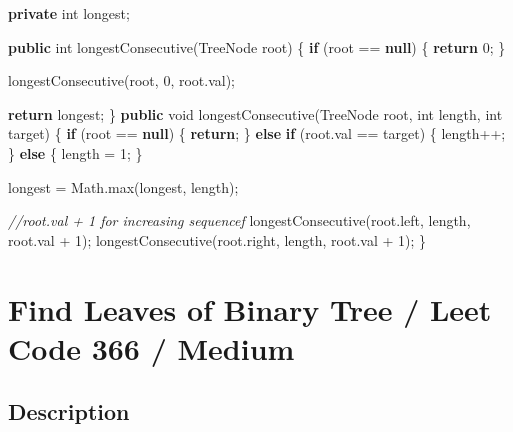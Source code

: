 \documentclass[]{book}
\newenvironment{Shaded}{\begin{snugshade}}{\end{snugshade}}
\newcommand{\BuiltInTok}[1]{#1}
\newcommand{\CommentTok}[1]{\textcolor[rgb]{0.56,0.35,0.01}{\textit{#1}}}
\newcommand{\DataTypeTok}[1]{\textcolor[rgb]{0.13,0.29,0.53}{#1}}
\newcommand{\DecValTok}[1]{\textcolor[rgb]{0.00,0.00,0.81}{#1}}
\newcommand{\FunctionTok}[1]{\textcolor[rgb]{0.00,0.00,0.00}{#1}}
\newcommand{\KeywordTok}[1]{\textcolor[rgb]{0.13,0.29,0.53}{\textbf{#1}}}
\newcommand{\NormalTok}[1]{#1}
\begin{document}
\begin{Shaded}
\begin{Highlighting}[]
\KeywordTok{private} \DataTypeTok{int}\NormalTok{ longest;}

\KeywordTok{public} \DataTypeTok{int} \FunctionTok{longestConsecutive}\NormalTok{(}\BuiltInTok{TreeNode}\NormalTok{ root) \{}
    \KeywordTok{if}\NormalTok{ (root == }\KeywordTok{null}\NormalTok{) \{}
        \KeywordTok{return} \DecValTok{0}\NormalTok{;}
\NormalTok{    \}}

    \FunctionTok{longestConsecutive}\NormalTok{(root, }\DecValTok{0}\NormalTok{, root.}\FunctionTok{val}\NormalTok{);}

    \KeywordTok{return}\NormalTok{ longest;}
\NormalTok{\}}
\KeywordTok{public} \DataTypeTok{void} \FunctionTok{longestConsecutive}\NormalTok{(}\BuiltInTok{TreeNode}\NormalTok{ root, }\DataTypeTok{int}\NormalTok{ length, }\DataTypeTok{int}\NormalTok{ target) \{}
    \KeywordTok{if}\NormalTok{ (root == }\KeywordTok{null}\NormalTok{) \{}
        \KeywordTok{return}\NormalTok{;}
\NormalTok{    \} }\KeywordTok{else} \KeywordTok{if}\NormalTok{ (root.}\FunctionTok{val}\NormalTok{ == target) \{}
\NormalTok{        length++;}
\NormalTok{    \} }\KeywordTok{else}\NormalTok{ \{}
\NormalTok{        length = }\DecValTok{1}\NormalTok{;}
\NormalTok{    \}}

\NormalTok{    longest = }\BuiltInTok{Math}\NormalTok{.}\FunctionTok{max}\NormalTok{(longest, length);}

    \CommentTok{//root.val + 1 for increasing sequencef}
    \FunctionTok{longestConsecutive}\NormalTok{(root.}\FunctionTok{left}\NormalTok{, length, root.}\FunctionTok{val}\NormalTok{ + }\DecValTok{1}\NormalTok{);}
    \FunctionTok{longestConsecutive}\NormalTok{(root.}\FunctionTok{right}\NormalTok{, length, root.}\FunctionTok{val}\NormalTok{ + }\DecValTok{1}\NormalTok{);}
\NormalTok{\}}
\end{Highlighting}
\end{Shaded}

\hypertarget{find-leaves-of-binary-tree-leet-code-366-medium}{%
\section{Find Leaves of Binary Tree / Leet Code 366 / Medium}\label{find-leaves-of-binary-tree-leet-code-366-medium}}

\hypertarget{description-72}{%
\subsection{Description}\label{description-72}}
\end{document}
